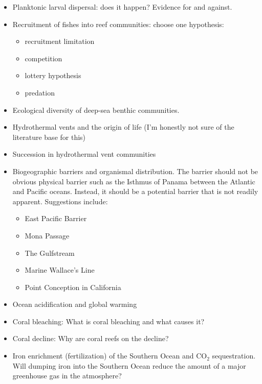 \documentclass[11pt]{article}
\begin{document}
\begin{itemize}
	\item Planktonic larval dispersal: does it happen?  Evidence for and against. 

	\item Recruitment of fishes into reef communities: choose one hypothesis:
	\begin{itemize}[label=$\circ$]
		\item recruitment limitation
		\item competition
		\item lottery hypothesis
		\item predation
	\end{itemize}
		
	\item Ecological diversity of deep-sea benthic communities.

	\item Hydrothermal vents and the origin of life (I’m honestly not sure of the literature base for this)

	\item Succession in hydrothermal vent communities

	\item Biogeographic barriers and organismal distribution.  The barrier should not be obvious physical barrier such as the Isthmus of Panama between the Atlantic and Pacific oceans.  Instead, it should be a potential barrier that is not readily apparent.  Suggestions include:
	\begin{itemize}[label=$\circ$]
		\item East Pacific Barrier
		\item Mona Passage
		\item The Gulfstream
		\item Marine Wallace’s Line
		\item Point Conception in California
	\end{itemize}
	\item Ocean acidification and global warming

	\item Coral bleaching: What is coral bleaching and what causes it?

	\item Coral decline: Why are coral reefs on the decline?

	\item Iron enrichment (fertilization) of the Southern Ocean and CO$_2$ sequestration.  Will dumping iron into the Southern Ocean reduce the amount of a major greenhouse gas in the atmosphere?


\end{itemize}
\end{document}
